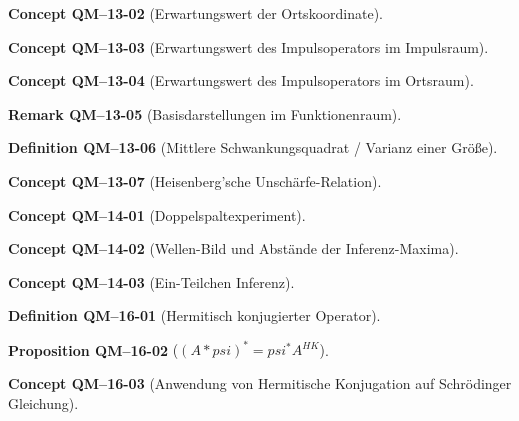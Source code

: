 \documentclass[10pt, letterpaper]{article}
\newcommand{\CustomHeading}[3]{%
  \par\medskip\noindent%
  \textbf{#1 #2} \textnormal{(#3)}.\enskip%
}
\newenvironment{DEF}[2]{\CustomHeading{Definition}{#1}{#2}}{}
\newenvironment{PROP}[2]{\CustomHeading{Proposition}{#1}{#2}}{}
\newenvironment{REM}[2]{\CustomHeading{Remark}{#1}{#2}}{}
\newenvironment{CONC}[2]{\CustomHeading{Concept}{#1}{#2}}{}
\begin{document}
\begin{CONC}{QM--13-02}{Erwartungswert der Ortskoordinate}
\end{CONC}

\begin{CONC}{QM--13-03}{Erwartungswert des Impulsoperators im Impulsraum}
\end{CONC}

\begin{CONC}{QM--13-04}{Erwartungswert des Impulsoperators im Ortsraum}
\end{CONC}

\begin{REM}{QM--13-05}{Basisdarstellungen im Funktionenraum}
\end{REM}

\begin{DEF}{QM--13-06}{Mittlere Schwankungsquadrat / Varianz einer Größe}
\end{DEF}

\begin{CONC}{QM--13-07}{Heisenberg'sche Unschärfe-Relation}
\end{CONC}

\begin{CONC}{QM--14-01}{Doppelspaltexperiment}
\end{CONC}

\begin{CONC}{QM--14-02}{Wellen-Bild und Abstände der Inferenz-Maxima}
\end{CONC}

\begin{CONC}{QM--14-03}{Ein-Teilchen Inferenz}
\end{CONC}

\begin{DEF}{QM--16-01}{Hermitisch konjugierter Operator}
\end{DEF}

\begin{PROP}{QM--16-02}{$(A*psi)^*=psi^*A^{HK}$}
\end{PROP}

\begin{CONC}{QM--16-03}{Anwendung von Hermitische Konjugation auf Schrödinger Gleichung}
\end{CONC}
\end{document}
